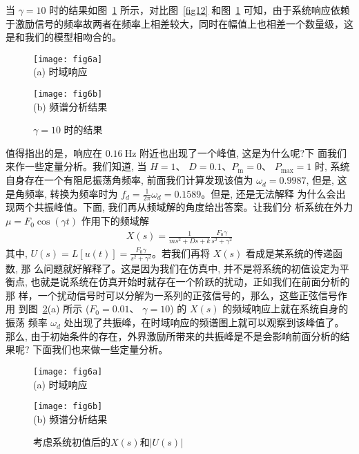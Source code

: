 \documentclass[withoutpreface,bwprint]{cumcmthesis} %
\begin{document}
当 $\gamma=10$ 时的结果如图~\ref{fig13} 所示，对比图~\ref{fig12} 和图~\ref{fig13} 可知，由于系统响应依赖于激励信号的频率故两者在频率上相差较大，同时在幅值上也相差一个数量级，这
是和我们的模型相吻合的。

\begin{figure}[h!t]
\begin{minipage}{0.48\linewidth}
  \centering
  {
  \texttt{[image: fig6a]}\\
  (a) 时域响应
  }
\end{minipage}\hfill
\begin{minipage}{0.48\linewidth}
  \centering
  {
  \texttt{[image: fig6b]}\\
  (b) 频谱分析结果
  }
\end{minipage}
    \caption{$\gamma=10$ 时的结果}
    \label{fig13}
\end{figure}

值得指出的是，响应在  $0.16 \mathrm{~Hz}$  附近也出现了一个峰值, 这是为什么呢?下 面我们来作一些定量分析。我们知道, 当  $H=1 $、 $D=0.1 $、$ P_{\mathrm{m}}=0 $、 $P_{\max }=1 $ 时, 系统自身存在一个有阻尼振荡角频率, 前面我们计算发现该值为 $ \omega_{d}=0.9987 $,
但是, 这是角频率, 转换为频率时为 $ f_{d}=\frac{1}{2 \pi} \omega_{d}=0.1589  $。但是, 还是无法解释 为什么会出现两个共振峰值。下面, 我们再从频域解的角度给出答案。让我们分 析系统在外力 $ \mu=F_{0} \cos (\gamma t) $ 作用下的频域解
\begin{align}
\label{eq19}
X(s)=\frac{1}{m s^{2}+D s+k} \frac{F_{0} \gamma}{s^{2}+\gamma^{2}}
\end{align}
其中,  $U(s)=L[u(t)]=\frac{F_{0} \gamma}{s^{2}+\gamma^{2}}  $。若我们再将 $ X(s) $ 看成是某系统的传递函数, 那 么问题就好解释了。这是因为我们在仿真中, 并不是将系统的初值设定为平衡点, 也就是说系统在仿真开始时就存在一个阶跃的扰动，正如我们在前面分析的那 样，一个扰动信号时可以分解为一系列的正弦信号的，那么，这些正弦信号作用 到图~\ref{fig14}(a)  所示 ($F_{0}=0.01 $、 $\gamma=10$)  的 $ X(s)$  的频域响应上就在系统自身的振荡 频率  $\omega_{d}$  处出现了共振峰，在时域响应的频谱图上就可以观察到该峰值了。那么, 由于初始条件的存在，外界激励所带来的共振峰是不是会影响前面分析的结果呢? 下面我们也来做一些定量分析。

\begin{figure}[h!t]
\begin{minipage}{0.48\linewidth}
  \centering
  {
  \texttt{[image: fig6a]}\\
  (a) 时域响应
  }
\end{minipage}\hfill
\begin{minipage}{0.48\linewidth}
  \centering
  {
  \texttt{[image: fig6b]}\\
  (b) 频谱分析结果
  }
\end{minipage}
    \caption{考虑系统初值后的$X(s)$和$|U(s)|$}
    \label{fig14}
\end{figure}
\end{document}
